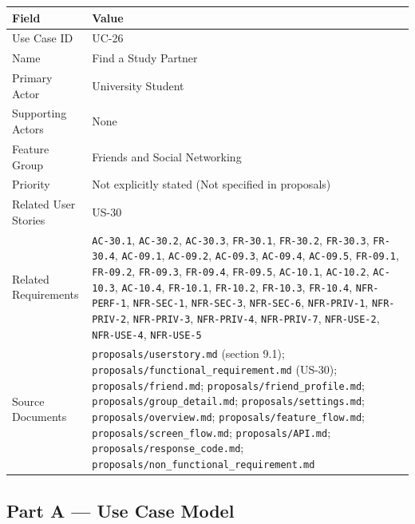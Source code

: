 \documentclass[12pt]{article}
\renewcommand{\baselinestretch}{1.5}
\begin{document}
\begingroup
\small
\renewcommand{\baselinestretch}{1.0}\selectfont
\renewcommand{\arraystretch}{1.15}
\setlength{\tabcolsep}{6pt}
\begin{longtable}{|>{\raggedright\arraybackslash}p{}|>{\raggedright\arraybackslash}p{}|}
\hline
\textbf{Field} & \textbf{Value} \\ \hline
\endhead
Use Case ID & UC-26 \\ \hline
Name & Find a Study Partner \\ \hline
Primary Actor & University Student \\ \hline
Supporting Actors & None \\ \hline
Feature Group & Friends and Social Networking \\ \hline
Priority & Not explicitly stated (Not specified in proposals) \\ \hline
Related User Stories & US-30 \\ \hline
Related Requirements & \texttt{AC-30.1}, \texttt{AC-30.2}, \texttt{AC-30.3}, \texttt{FR-30.1}, \texttt{FR-30.2}, \texttt{FR-30.3}, \texttt{FR-30.4}, \texttt{AC-09.1}, \texttt{AC-09.2}, \texttt{AC-09.3}, \texttt{AC-09.4}, \texttt{AC-09.5}, \texttt{FR-09.1}, \texttt{FR-09.2}, \texttt{FR-09.3}, \texttt{FR-09.4}, \texttt{FR-09.5}, \texttt{AC-10.1}, \texttt{AC-10.2}, \texttt{AC-10.3}, \texttt{AC-10.4}, \texttt{FR-10.1}, \texttt{FR-10.2}, \texttt{FR-10.3}, \texttt{FR-10.4}, \texttt{NFR-PERF-1}, \texttt{NFR-SEC-1}, \texttt{NFR-SEC-3}, \texttt{NFR-SEC-6}, \texttt{NFR-PRIV-1}, \texttt{NFR-PRIV-2}, \texttt{NFR-PRIV-3}, \texttt{NFR-PRIV-4}, \texttt{NFR-PRIV-7}, \texttt{NFR-USE-2}, \texttt{NFR-USE-4}, \texttt{NFR-USE-5} \\ \hline
Source Documents & \texttt{proposals/userstory.md} (section 9.1); \texttt{proposals/functional\_requirement.md} (US-30); \texttt{proposals/friend.md}; \texttt{proposals/friend\_profile.md}; \texttt{proposals/group\_detail.md}; \texttt{proposals/settings.md}; \texttt{proposals/overview.md}; \texttt{proposals/feature\_flow.md}; \texttt{proposals/screen\_flow.md}; \texttt{proposals/API.md}; \texttt{proposals/response\_code.md}; \texttt{proposals/non\_functional\_requirement.md} \\ \hline
\end{longtable}
\endgroup
\par\medskip

\hypertarget{sec:part-a-use-case-model}{}
\subsection*{Part A --- Use Case Model}
\par\medskip
\end{document}
